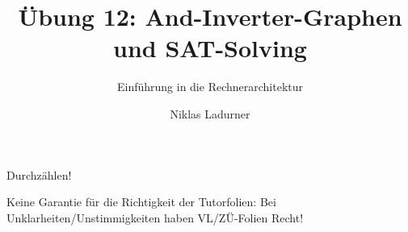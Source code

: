 \documentclass[
  german,            %
  aspectratio=169,    %
]{tumbeamer}
\title{Übung 12: And-Inverter-Graphen\\und SAT-Solving}
\subtitle{Einführung in die Rechnerarchitektur}
\author{Niklas Ladurner}
\institute{\theChairName\\\theDepartmentName\\\theUniversityName}
\date{\DTMdisplaydate{2024}{1}{19}{-1}}
\begin{document}
\maketitle

\begin{frame}[c]{}{}
  \begin{center}
    \LARGE  Durchzählen!
  \end{center}
\end{frame}

\begin{frame}[c]{}{}
  \begin{center}
    \LARGE  Keine Garantie für die Richtigkeit der Tutorfolien: Bei Unklarheiten/Unstimmigkeiten
    haben VL/ZÜ-Folien Recht!
  \end{center}
\end{frame}
\end{document}

